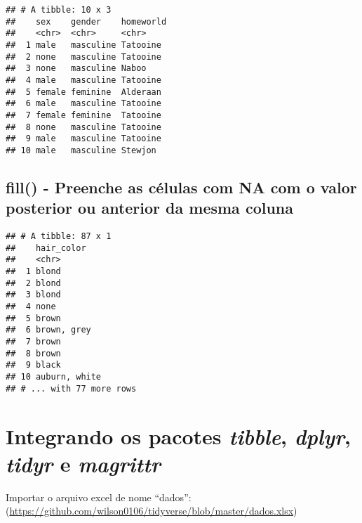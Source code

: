 \documentclass[]{book}
\newenvironment{Shaded}{\begin{snugshade}}{\end{snugshade}}
\newcommand{\KeywordTok}[1]{\textcolor[rgb]{0.13,0.29,0.53}{\textbf{#1}}}
\newcommand{\NormalTok}[1]{#1}
\newcommand{\OperatorTok}[1]{\textcolor[rgb]{0.81,0.36,0.00}{\textbf{#1}}}
\newcommand{\StringTok}[1]{\textcolor[rgb]{0.31,0.60,0.02}{#1}}
\begin{document}
\begin{verbatim}
## # A tibble: 10 x 3
##    sex    gender    homeworld
##    <chr>  <chr>     <chr>    
##  1 male   masculine Tatooine 
##  2 none   masculine Tatooine 
##  3 none   masculine Naboo    
##  4 male   masculine Tatooine 
##  5 female feminine  Alderaan 
##  6 male   masculine Tatooine 
##  7 female feminine  Tatooine 
##  8 none   masculine Tatooine 
##  9 male   masculine Tatooine 
## 10 male   masculine Stewjon
\end{verbatim}

\hypertarget{fill---preenche-as-cuxe9lulas-com-na-com-o-valor-posterior-ou-anterior-da-mesma-coluna}{%
\section{fill() - Preenche as células com NA com o valor posterior ou anterior da mesma coluna}\label{fill---preenche-as-cuxe9lulas-com-na-com-o-valor-posterior-ou-anterior-da-mesma-coluna}}

\begin{Shaded}
\end{Shaded}

\begin{verbatim}
## # A tibble: 87 x 1
##    hair_color   
##    <chr>        
##  1 blond        
##  2 blond        
##  3 blond        
##  4 none         
##  5 brown        
##  6 brown, grey  
##  7 brown        
##  8 brown        
##  9 black        
## 10 auburn, white
## # ... with 77 more rows
\end{verbatim}

\hypertarget{integrando-os-pacotes-tibble-dplyr-tidyr-e-magrittr}{%
\chapter{\texorpdfstring{Integrando os pacotes \emph{tibble}, \emph{dplyr}, \emph{tidyr} e \emph{magrittr}}{Integrando os pacotes tibble, dplyr, tidyr e magrittr}}\label{integrando-os-pacotes-tibble-dplyr-tidyr-e-magrittr}}

Importar o arquivo excel de nome ``dados'': (\url{https://github.com/wilson0106/tidyverse/blob/master/dados.xlsx})
\end{document}
